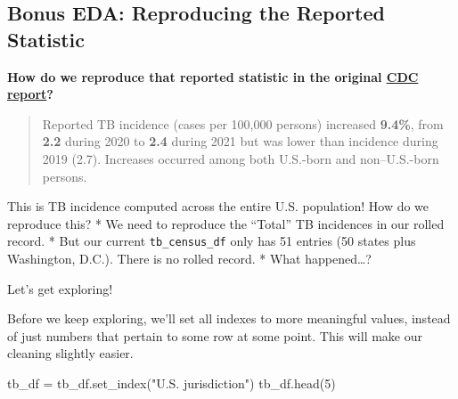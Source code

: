 \documentclass[
  letterpaper,
  DIV=11,
  numbers=noendperiod]{scrreprt}
\newenvironment{Shaded}{\begin{snugshade}}{\end{snugshade}}
\newcommand{\DecValTok}[1]{\textcolor[rgb]{0.68,0.00,0.00}{#1}}
\newcommand{\NormalTok}[1]{\textcolor[rgb]{0.00,0.23,0.31}{#1}}
\newcommand{\OperatorTok}[1]{\textcolor[rgb]{0.37,0.37,0.37}{#1}}
\newcommand{\StringTok}[1]{\textcolor[rgb]{0.13,0.47,0.30}{#1}}
\begin{document}
\hypertarget{bonus-eda-reproducing-the-reported-statistic}{%
\subsection{Bonus EDA: Reproducing the Reported
Statistic}\label{bonus-eda-reproducing-the-reported-statistic}}

\textbf{How do we reproduce that reported statistic in the original
\href{https://www.cdc.gov/mmwr/volumes/71/wr/mm7112a1.htm?s_cid=mm7112a1_w}{CDC
report}?}

\begin{quote}
Reported TB incidence (cases per 100,000 persons) increased
\textbf{9.4\%}, from \textbf{2.2} during 2020 to \textbf{2.4} during
2021 but was lower than incidence during 2019 (2.7). Increases occurred
among both U.S.-born and non--U.S.-born persons.
\end{quote}

This is TB incidence computed across the entire U.S. population! How do
we reproduce this? * We need to reproduce the ``Total'' TB incidences in
our rolled record. * But our current \texttt{tb\_census\_df} only has 51
entries (50 states plus Washington, D.C.). There is no rolled record. *
What happened\ldots?

Let's get exploring!

Before we keep exploring, we'll set all indexes to more meaningful
values, instead of just numbers that pertain to some row at some point.
This will make our cleaning slightly easier.

\begin{Shaded}
\begin{Highlighting}[]
\NormalTok{tb\_df }\OperatorTok{=}\NormalTok{ tb\_df.set\_index(}\StringTok{"U.S. jurisdiction"}\NormalTok{)}
\NormalTok{tb\_df.head(}\DecValTok{5}\NormalTok{)}
\end{Highlighting}
\end{Shaded}
\end{document}
